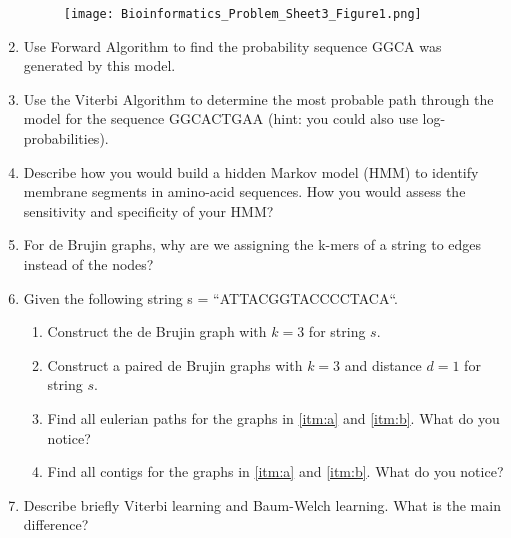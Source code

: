 \documentclass[11pt,runningheads,a4paper]{article}
\begin{document}
\begin{enumerate}
\begin{figure}[H]
		\centering
		\texttt{[image: Bioinformatics\_Problem\_Sheet3\_Figure1.png]}
		\end{figure}
	\item Use Forward Algorithm to find the probability sequence GGCA was generated by this model.
	\item Use the Viterbi Algorithm to determine the most probable path through the model for the sequence GGCACTGAA (hint: you could also use log-probabilities).
	\item Describe how you would build a hidden Markov model (HMM) to identify membrane segments in amino-acid sequences\@. How you would assess the sensitivity and specificity of your HMM?
	\item For de Brujin graphs, why are we assigning the k-mers of a string to edges instead of the nodes?
	\item Given the following string s = ``ATTACGGTACCCCTACA``.
		\begin{enumerate}
			\item \label{itm:a} Construct the de Brujin graph with $k=3$ for string $s$.
			\item \label{itm:b} Construct a paired de Brujin graphs with $k=3$ and distance $d=1$ for string $s$.
      \item Find all eulerian paths for the graphs in \ref{itm:a} and \ref{itm:b}\@. What do you notice?
      \item Find all contigs for the graphs in \ref{itm:a} and \ref{itm:b}\@. What do you notice?
		\end{enumerate}
	\item Describe briefly Viterbi learning and Baum-Welch learning. What is the main difference?
\end{enumerate}
\end{document}
